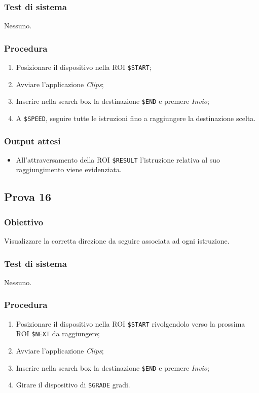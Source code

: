\documentclass[../Sperimentazione.tex]{subfiles}
\begin{document}
	\subsubsection{Test di sistema}
		Nessuno.
		
	\subsubsection{Procedura}
		\begin{enumerate}
		\item Posizionare il dispositivo nella ROI  \verb|$START|;
		\item Avviare l'applicazione \textit{Clips};
		\item Inserire nella search box la destinazione  \verb|$END| e premere \textit{Invio};
		\item A \verb|$SPEED|, seguire tutte le istruzioni fino a raggiungere la destinazione scelta.
		\end{enumerate}
		
	\subsubsection{Output attesi}
		\begin{itemize}
		\item All'attraversamento della ROI  \verb|$RESULT| l'istruzione relativa al suo raggiungimento viene evidenziata.
		\end{itemize}

	
		
\newpage	
\subsection{Prova 16} %
\label{subsec:Prova16}	
	
	\subsubsection{Obiettivo}
		Visualizzare la corretta direzione da seguire associata ad ogni istruzione.
		
	\subsubsection{Test di sistema}
		Nessuno.
		
	\subsubsection{Procedura}
		\begin{enumerate}
		\item Posizionare il dispositivo nella ROI \verb|$START| rivolgendolo verso la prossima ROI  \verb|$NEXT| da raggiungere;
		\item Avviare l'applicazione \textit{Clips};
		\item Inserire nella search box la destinazione  \verb|$END| e premere \textit{Invio};
		\item Girare il dispositivo di  \verb|$GRADE| gradi.
		\end{enumerate}
		
\end{document}
